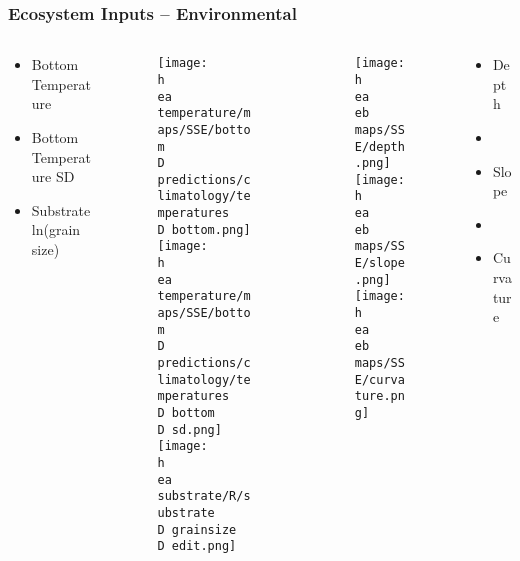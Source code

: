\documentclass{beamer}
\numberwithin{equation}{section}		%
\numberwithin{figure}{section}	   	%
\numberwithin{table}{section}				%
\newcommand{\D}{.}  %
\newcommand{\h}{C:/} %
\newcommand{\eb}{bathymetry/}
\newcommand{\ea}{bio.data/aegis/}
\begin{document}
\begin{frame}
\frametitle{Ecosystem Inputs -- Environmental}
	\begin{columns}
	\begin{column}{0.25\textwidth}
	\begin{itemize}
	  \setlength\itemsep{2em}
		\item[] Bottom Temperature 
		\item[] Bottom Temperature SD
		\item[] Substrate ln(grain size)
	\end{itemize}
	\end{column}

	\begin{column}{0.25\textwidth}
 	\begin{figure}
    \texttt{[image: \\h \\ea temperature/maps/SSE/bottom\\D predictions/climatology/temperatures\\D bottom.png]}\\   
    \texttt{[image: \\h \\ea temperature/maps/SSE/bottom\\D predictions/climatology/temperatures\\D bottom\\D sd.png]}\\   
    \texttt{[image: \\h \\ea substrate/R/substrate\\D grainsize\\D edit.png]}  
  	\end{figure}
  	\end{column}

  	\begin{column}{0.25\textwidth}
 	\begin{figure}
    \texttt{[image: \\h \\ea \\eb maps/SSE/depth.png]}\\   
    \texttt{[image: \\h \\ea \\eb maps/SSE/slope.png]}\\   
    \texttt{[image: \\h \\ea \\eb maps/SSE/curvature.png]}  
  	\end{figure}
  	\end{column}

	\begin{column}{0.25\textwidth}
	\begin{itemize}
	  \setlength\itemsep{2em}
		\item[] Depth
		\item[] 
		\item[] Slope
		\item[] 
		\item[] Curvature
	\end{itemize}
  	\end{column}

  	\end{columns}
\end{frame}
\end{document}
